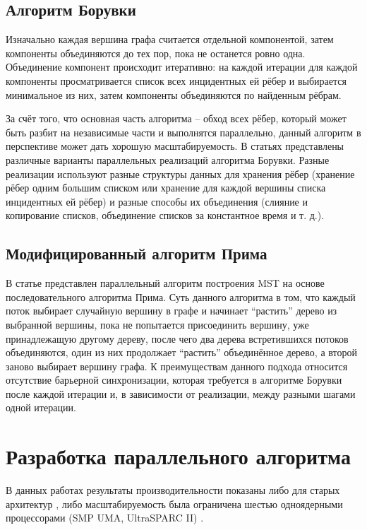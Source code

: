 \documentclass{article}
\begin{document}
\subsection{Алгоритм Борувки}
Изначально каждая вершина графа считается отдельной компонентой, затем компоненты объединяются до тех пор, пока не останется ровно одна.
Объединение компонент происходит итеративно: на каждой итерации для каждой компоненты просматривается список всех инцидентных ей рёбер и выбирается минимальное из них, затем компоненты объединяются по найденным рёбрам.

За счёт того, что основная часть алгоритма -- обход всех рёбер, который может быть разбит на независимые части и выполнятся параллельно, данный алгоритм в перспективе может дать хорошую масштабируемость.
В статьях \cite{dense-mst,boruvka-prima,boruvka-cm5} представлены различные варианты параллельных реализаций алгоритма Борувки.
Разные реализации используют разные структуры данных для хранения рёбер (хранение рёбер одним большим списком или хранение для каждой вершины списка инцидентных ей рёбер) и разные способы их объединения (слияние и копирование списков, объединение списков за константное время и т. д.).

\subsection{Модифицированный алгоритм Прима}
В статье \cite{boruvka-prima} представлен параллельный алгоритм построения MST на основе последовательного алгоритма Прима.
Суть данного алгоритма в том, что каждый поток выбирает случайную вершину в графе и начинает ``растить'' дерево из выбранной вершины, пока не попытается присоединить вершину, уже принадлежащую другому дереву, после чего два дерева встретившихся потоков объединяются, один из них продолжает ``растить'' объединённое дерево, а второй заново выбирает вершину графа. %
К преимуществам данного подхода относится отсутствие барьерной синхронизации, которая требуется в алгоритме Борувки после каждой итерации и, в зависимости от реализации, между разными шагами одной итерации.

\newpage
\section{Разработка параллельного алгоритма}
В данных работах \cite{dense-mst,boruvka-prima,boruvka-cm5} результаты производительности показаны либо для старых архитектур \cite{dense-mst,boruvka-cm5}, либо масштабируемость была ограничена шестью одноядерными процессорами (SMP  UMA, UltraSPARC II) \cite{boruvka-prima} .
\end{document}
